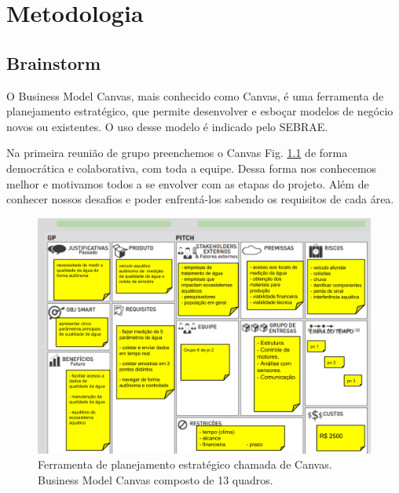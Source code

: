 \chapter[Metodologia]{Metodologia}

\section{Brainstorm}

O Business Model Canvas, mais conhecido como Canvas, é uma ferramenta de planejamento estratégico, que permite desenvolver e esboçar modelos de negócio novos ou existentes. O uso desse modelo é indicado pelo SEBRAE.

Na primeira reunião de grupo  preenchemos o Canvas Fig. \ref{Canvas} de forma democrática e colaborativa, com toda a equipe. Dessa forma nos conhecemos melhor e motivamos todos a se envolver com as etapas do projeto. Além de conhecer nossos desafios e poder enfrentá-los sabendo os requisitos de cada área. 


 \begin{figure} [!htp]
	\centering
	\includegraphics[scale=0.3]{figuras/Canvas}
	\caption{Ferramenta de planejamento estratégico chamada de Canvas. Business Model Canvas composto de 13 quadros.}
	\label{Canvas}
\end{figure}

